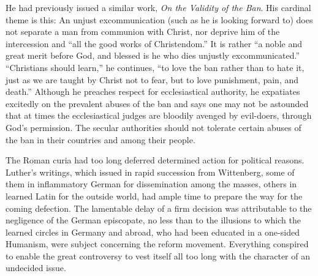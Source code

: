 He had previously issued a similar
work, \textit{On the Validity of the Ban}. His cardinal theme is this: An
unjust excommunication (such as he is looking forward to) does not
separate a man from communion with Christ, nor deprive him of
the intercession and “all the good works of Christendom.” It is rather
“a noble and great merit before God, and blessed is he who dies unjustly
excommunicated.” “Christians should learn,” he continues,
“to love the ban rather than to hate it, just as we are taught by
Christ not to fear, but to love punishment, pain, and death.” Although
he preaches respect for ecclesiastical authority, he expatiates
excitedly on the prevalent abuses of the ban and says one may not
be astounded that at times the ecclesiastical judges are bloodily
avenged by evil-doers, through God’s permission. The secular authorities
should not tolerate certain abuses of the ban in their countries
and among their people.

The Roman curia had too long deferred determined action for
political reasons. Luther’s writings, which issued in rapid succession
from Wittenberg, some of them in inflammatory German for dissemination
among the masses, others in learned Latin for the outside
world, had ample time to prepare the way for the coming defection.
The lamentable delay of a firm decision was attributable to the negligence
of the German episcopate, no less than to the illusions to which
the learned circles in Germany and abroad, who had been educated in
a one-sided Humanism, were subject concerning the reform movement.
Everything conspired to enable the great controversy to vest
itself all too long with the character of an undecided issue.
